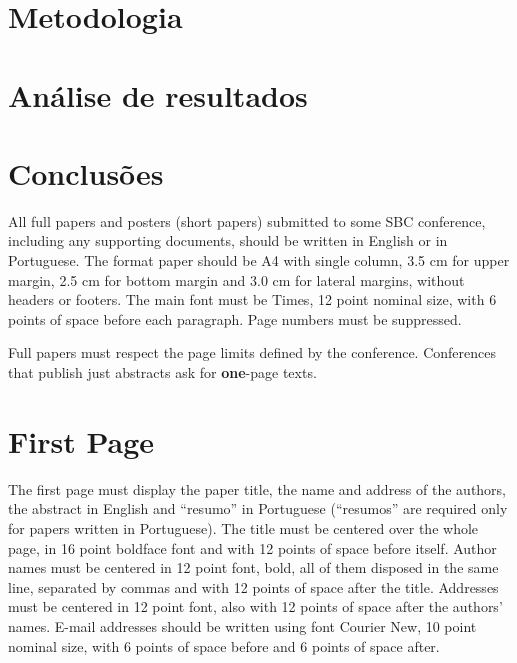 \documentclass[12pt]{article}
\begin{document}
\section{Metodologia} %



\section{Análise de resultados}


\section{Conclusões}




All full papers and posters (short papers) submitted to some SBC conference,
including any supporting documents, should be written in English or in
Portuguese. The format paper should be A4 with single column, 3.5 cm for upper
margin, 2.5 cm for bottom margin and 3.0 cm for lateral margins, without
headers or footers. The main font must be Times, 12 point nominal size, with 6
points of space before each paragraph. Page numbers must be suppressed.

Full papers must respect the page limits defined by the conference.
Conferences that publish just abstracts ask for \textbf{one}-page texts.

\section{First Page} \label{sec:firstpage}

The first page must display the paper title, the name and address of the
authors, the abstract in English and ``resumo'' in Portuguese (``resumos'' are
required only for papers written in Portuguese). The title must be centered
over the whole page, in 16 point boldface font and with 12 points of space
before itself. Author names must be centered in 12 point font, bold, all of
them disposed in the same line, separated by commas and with 12 points of
space after the title. Addresses must be centered in 12 point font, also with
12 points of space after the authors' names. E-mail addresses should be
written using font Courier New, 10 point nominal size, with 6 points of space
before and 6 points of space after.
\end{document}
